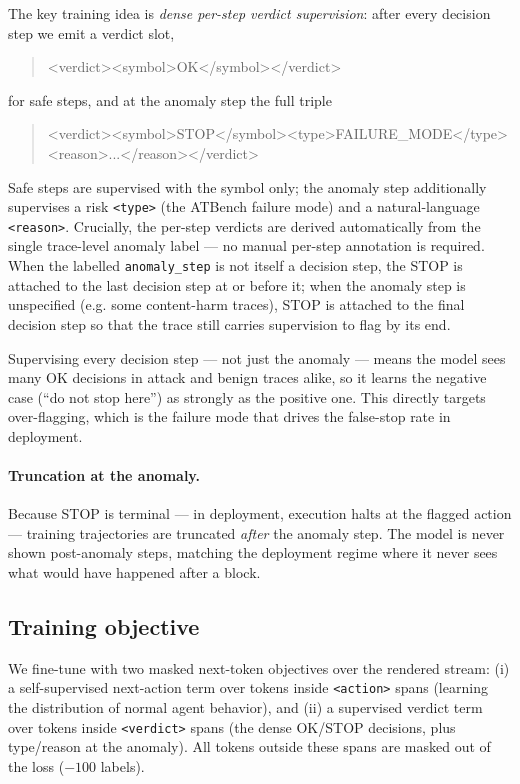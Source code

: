 The key training idea is \emph{dense per-step verdict supervision}: after every
decision step we emit a verdict slot,
\begin{quote}\small\ttfamily
<verdict><symbol>OK</symbol></verdict>
\end{quote}
for safe steps, and at the anomaly step the full triple
\begin{quote}\small\ttfamily
<verdict><symbol>STOP</symbol><type>FAILURE\_MODE</type><reason>...</reason></verdict>
\end{quote}
Safe steps are supervised with the symbol only; the anomaly step additionally
supervises a risk \texttt{<type>} (the ATBench failure mode) and a
natural-language \texttt{<reason>}. Crucially, the per-step verdicts are derived
automatically from the single trace-level anomaly label --- no manual per-step
annotation is required. When the labelled \texttt{anomaly\_step} is not itself a
decision step, the \textsc{STOP} is attached to the last decision step at or
before it; when the anomaly step is unspecified (e.g. some content-harm traces),
\textsc{STOP} is attached to the final decision step so that the trace still
carries supervision to flag by its end.

Supervising every decision step --- not just the anomaly --- means the model
sees many \textsc{OK} decisions in attack and benign traces alike, so it learns
the negative case (``do not stop here'') as strongly as the positive one. This
directly targets over-flagging, which is the failure mode that drives the
false-stop rate in deployment.

\paragraph{Truncation at the anomaly.}
Because \textsc{STOP} is terminal --- in deployment, execution halts at the
flagged action --- training trajectories are truncated \emph{after} the anomaly
step. The model is never shown post-anomaly steps, matching the deployment
regime where it never sees what would have happened after a block.

\subsection{Training objective}
\label{sec:method:loss}

We fine-tune with two masked next-token objectives over the rendered stream:
(i) a self-supervised next-action term over tokens inside \texttt{<action>}
spans (learning the distribution of normal agent behavior), and (ii) a
supervised verdict term over tokens inside \texttt{<verdict>} spans (the dense
\textsc{OK}/\textsc{STOP} decisions, plus type/reason at the anomaly). All
tokens outside these spans are masked out of the loss ($-100$ labels).

